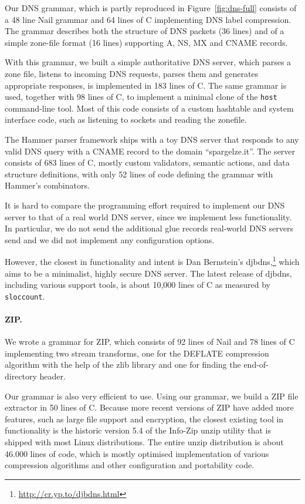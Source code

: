 Our DNS grammar, which is partly reproduced in Figure~\ref{fig:dns-full} consists of a 48 line  Nail
grammar and 64 lines of C implementing DNS label compression. 
The grammar describes both the structure of DNS packets (36 lines) and of a simple zone-file format
(16 lines) supporting A, NS, MX and CNAME records. 

  
With this grammar, we built a simple authoritative DNS server, which parses a zone file, listens to incoming DNS
requests, parses them and generates appropriate responses, is implemented in 183 lines of C. The
same grammar is used, together with 98 lines of C, to implement a minimal clone of the
\texttt{host} command-line tool. Most of this code consists of a custom hashtable and system
interface code, such as listening to sockets and reading the zonefile. 

The Hammer parser framework\cite{hammer-dns} ships with a toy DNS server that responds to
any valid DNS query with a CNAME record to the domain ``spargelze.it''. 
The server consists of 683 lines of C, mostly custom validators, semantic actions,
and data structure definitions, with only 52 lines of code defining the
grammar with Hammer's combinators.

It is hard to compare the programming effort required to implement
our DNS server to that of a real world DNS server, since we implement less functionality.
 In particular, we do not send the additional glue records real-world DNS servers send and
we did not implement any configuration options.

However, the closest in functionality and intent is Dan Bernstein's
djbdns,\footnote{\url{http://cr.yp.to/djbdns.html}} which aims to be
a minimalist, highly secure DNS server. The latest release of djbdns,
including various support tools, is about 10,000 lines of C as measured by
\texttt{sloccount}. 

\paragraph{ZIP.}


We wrote a grammar for ZIP, which consists of 92 lines of Nail and 78 lines of C implementing two
stream transforms, one for the DEFLATE compression algorithm with the help of the zlib library and
one for finding the end-of-directory header. 

Our grammar is also very efficient to use. Using our grammar, we build a ZIP file extractor in 50
lines of C. Because more recent versions of ZIP have added more features, such as large file support
and encryption, the closest existing tool in functionality is the historic version 5.4 of the Info-Zip unzip
utility\cite{infozip} that is shipped with most Linux distributions. The entire unzip distribution
is about 46.000 lines of code, which is mostly optimised implementation of various compression
algorithms and other configuration and portability code.

